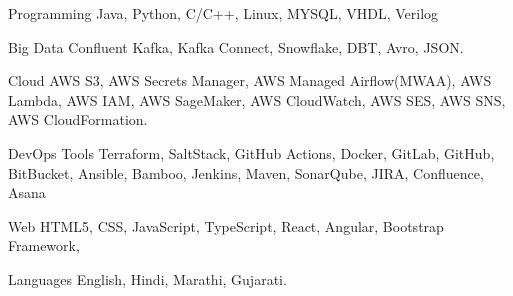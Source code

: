 \vspace{-1.75mm}


\begin{cvskills}


\cvskill
{Programming} %
{Java, Python, C/C++, Linux, MYSQL, VHDL, Verilog} %


\cvskill
{Big Data} %
{Confluent Kafka, Kafka Connect, Snowflake, DBT, Avro, JSON.} %

\cvskill
{Cloud} %
{AWS S3, AWS Secrets Manager, AWS Managed Airflow(MWAA), AWS Lambda, AWS IAM, AWS SageMaker, AWS CloudWatch, AWS SES, AWS SNS, AWS CloudFormation.} %


\cvskill
{DevOps Tools} %
{Terraform, SaltStack, GitHub Actions, Docker, GitLab, GitHub, BitBucket, Ansible, Bamboo, Jenkins, Maven, SonarQube, JIRA, Confluence, Asana } %

\cvskill
{Web} %
{HTML5, CSS, JavaScript, TypeScript, React, Angular, Bootstrap Framework,} %

\cvskill
{Languages} %
{English, Hindi, Marathi, Gujarati.} %


\end{cvskills}